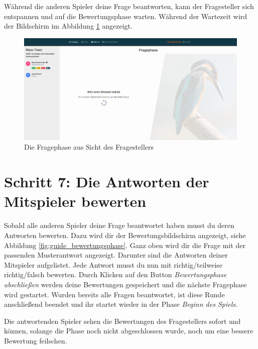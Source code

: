 \documentclass[a4paper,11pt,listof=numbered,glossary=totoc,parskip=half,toc=bib]{scrreprt}
\begin{document}
\begin{appendices}
	Während die anderen Spieler deine Frage beantworten, kann der Fragesteller sich entspannen und auf die Bewertungsphase warten. Während der Wartezeit wird der Bildschirm im Abbildung \ref{fig:guide_fragephase_warten} angezeigt.
	
	\begin{figure}[h!]
		\centering
		\includegraphics[width=\textwidth]{UserGuide/Fragephase_warten.png}
		\caption{Die Fragephase aus Sicht des Fragestellers}
		\label{fig:guide_fragephase_warten}
	\end{figure}
	
	\newpage
	\section*{Schritt 7: Die Antworten der Mitspieler bewerten}
					
	Sobald alle anderen Spieler deine Frage beantwortet haben musst du deren Antworten bewerten. Dazu wird dir der Bewertungsbildschirm angezeigt, siehe Abbildung \ref{fig:guide_bewertungsphase}.
	Ganz oben wird dir die Frage mit der passenden Musterantwort angezeigt. Darunter sind die Antworten deiner Mitspieler aufgelistet. Jede Antwort musst du nun mit richtig/teilweise richtig/falsch bewerten. Durch Klicken auf den Button \textit{Bewertungsphase abschließen} werden deine Bewertungen gespeichert und die nächste Fragephase wird gestartet. Wurden bereits alle Fragen beantwortet, ist diese Runde anschließend beendet und ihr startet wieder in der Phase \textit{Beginn des Spiels}.
	
	Die antwortenden Spieler sehen die Bewertungen des Fragestellers sofort und können, solange die Phase noch nicht abgeschlossen wurde, noch um eine bessere Bewertung feilschen.
	

\end{appendices}
\end{document}
